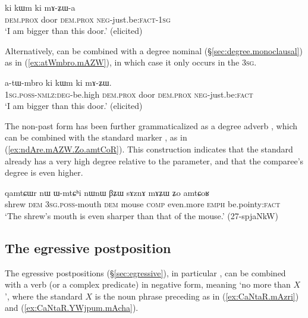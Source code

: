 \begin{exe}
\ex \label{ex:mAZWa}
 \gll ki kɯm ki mɤ-ʑɯ-a \\
\textsc{dem}.\textsc{prox} door \textsc{dem}.\textsc{prox} \textsc{neg}-just.be:\textsc{fact}-\textsc{1sg} \\
\glt `I am bigger than this door.' (elicited)
\end{exe}

Alternatively,  can be combined with a degree nominal (§\ref{sec:degree.monoclausal}) as in (\ref{ex:atWmbro.mAZW}), in which case it only occurs in the \textsc{3sg}.

\begin{exe}
\ex \label{ex:atWmbro.mAZW}
 \gll a-tɯ-mbro ki kɯm ki mɤ-ʑɯ. \\
 \textsc{1sg}.\textsc{poss}-\textsc{nmlz}:\textsc{deg}-be.high \textsc{dem}.\textsc{prox} door \textsc{dem}.\textsc{prox} \textsc{neg}-just.be:\textsc{fact} \\
\glt `I am bigger than this door.' (elicited)
\end{exe}

The non-past form  has been further grammaticalized as a degree adverb , which can be combined with the standard marker , as in (\ref{ex:ndAre.mAZW.Zo.amtCoR}). This construction indicates that the standard already has a very high degree relative to the parameter, and that the comparee's degree is even higher.

\begin{exe}
\ex \label{ex:ndAre.mAZW.Zo.amtCoR}
 \gll qamtɕɯr nɯ ɯ-mtɕʰi nɯnɯ βʑɯ sɤznɤ mɤʑɯ ʑo amtɕoʁ \\
 shrew \textsc{dem} \textsc{3sg}.\textsc{poss}-mouth \textsc{dem} mouse \textsc{comp} even.more \textsc{emph} be.pointy:\textsc{fact} \\
\glt `The shrew's mouth is even sharper than that of the mouse.' (27-spjaNkW)
\end{exe}

\subsection{The egressive postposition } \label{sec:egressive.comparative}
 
The egressive postpositions (§\ref{sec:egressive}), in particular , can be combined with a verb (or a complex predicate) in negative form, meaning `no more than $X$', where the standard $X$ is the noun phrase preceding  as in (\ref{ex:CaNtaR.mAzri}) and (\ref{ex:CaNtaR.YWjpum.mAcha}).

